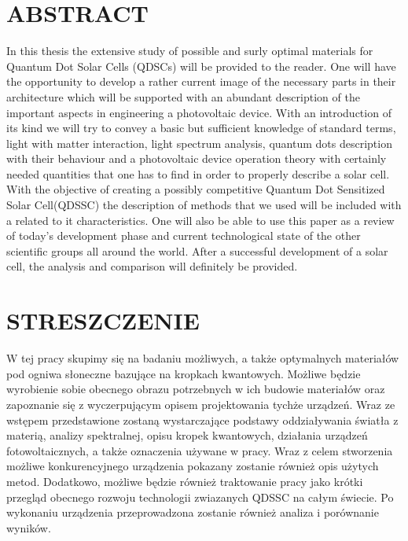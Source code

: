\documentclass[12pt,twoside]{report}
\numberwithin{equation}{subsection}
\begin{document}
\graphicspath{ {images/} }

\newpage

\begingroup

\let\clearpage\relax
\chapter*{\textbf{ABSTRACT}}

In this thesis the extensive study of possible and surly optimal materials for Quantum Dot Solar Cells (QDSCs) will be provided to the reader. One will have the opportunity to develop a rather current image of the necessary parts in their architecture which will be supported with an abundant description of the important aspects in engineering a photovoltaic device. With an introduction of its kind we will try to convey a basic but sufficient knowledge of standard terms, light with matter interaction, light spectrum analysis, quantum dots description with their behaviour and a photovoltaic device operation theory with certainly needed quantities that one has to find in order to properly describe a solar cell. With the objective of creating a possibly competitive Quantum Dot Sensitized Solar Cell(QDSSC) the description of methods that we used will be included with a related to it characteristics. One will also be able to use this paper as a review of today's development phase and current technological state of the other scientific groups all around the world.  After a successful development of a solar cell, the analysis and comparison will definitely be provided.

\chapter*{STRESZCZENIE}

W tej pracy skupimy się na badaniu możliwych, a także optymalnych materiałów pod ogniwa słoneczne bazujące na kropkach kwantowych. Możliwe będzie wyrobienie sobie obecnego obrazu potrzebnych w ich budowie materiałów oraz zapoznanie się z wyczerpującym opisem projektowania tychże urządzeń. Wraz ze wstępem przedstawione zostaną wystarczające podstawy oddziaływania światła z materią, analizy spektralnej, opisu kropek kwantowych, działania urządzeń fotowoltaicznych, a także oznaczenia używane w pracy. Wraz z celem stworzenia możliwe konkurencyjnego urządzenia pokazany zostanie również opis użytych metod. Dodatkowo, możliwe będzie również traktowanie pracy jako krótki przegląd obecnego rozwoju technologii zwiazanych QDSSC na całym świecie. Po wykonaniu urządzenia przeprowadzona zostanie również analiza i porównanie wyników.
\end{document}
